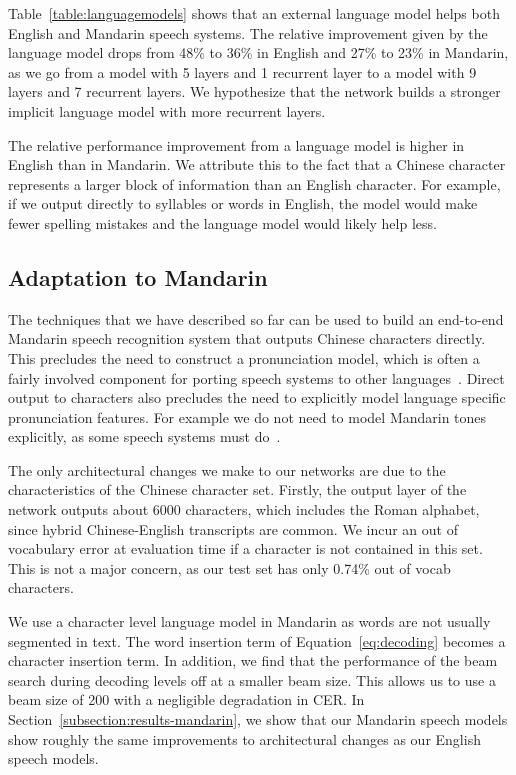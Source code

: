 \documentclass{article}
\begin{document}
Table~\ref{table:languagemodels} shows that an external language model helps both English and Mandarin speech systems. The relative improvement given by the language model drops from 48\% to 36\% in English and 27\% to 23\% in Mandarin, as we go from a model with 5 layers and 1 recurrent layer to a model with 9 layers and 7 recurrent layers. We hypothesize that the network builds a stronger implicit language model with more recurrent layers. 

The relative performance improvement from a language model is higher in English than in Mandarin. We attribute this to the fact that a Chinese character represents a larger block of information than an English character. For example, if we output directly to syllables or words in English, the model would make fewer spelling mistakes and the language model would likely help less.

\subsection{Adaptation to Mandarin}
\label{subsection:chinesemodel}

The techniques that we have described so far can be used to build an end-to-end Mandarin speech recognition system that outputs Chinese characters directly. This precludes the need to construct a pronunciation model, which is often a fairly involved component for porting speech systems to other languages~\cite{shan2010}. Direct output to characters also precludes the need to explicitly model language specific pronunciation features. For example we do not need to model Mandarin tones explicitly, as some speech systems must do~\cite{shan2010, niu2013}.

The only architectural changes we make to our networks are due to the characteristics of the Chinese character set. Firstly, the output layer of the network outputs about 6000 characters, which includes the Roman alphabet, since hybrid Chinese-English transcripts are common. We incur an out of vocabulary error at evaluation time if a character is not contained in this set. This is not a major concern, as our test set has only 0.74\% out of vocab characters.

We use a character level language model in Mandarin as words are not usually segmented in text. The word insertion term of Equation~\ref{eq:decoding} becomes a character insertion term. In addition, we find that the performance of the beam search during decoding levels off at a smaller beam size. This allows us to use a beam size of 200 with a negligible degradation in CER. In Section~\ref{subsection:results-mandarin}, we show that our Mandarin speech models show roughly the same improvements to architectural changes as our English speech models.
\end{document}
